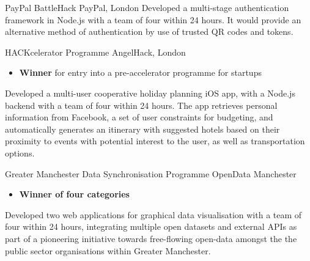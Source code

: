 \documentclass[12pt,a4paper]{article}
\begin{document}
       {PayPal BattleHack}
       {PayPal, London}
{%
  Developed a multi-stage authentication framework in Node.js with a team of
  four within 24 hours. It would provide an alternative method of authentication
  by use of trusted QR codes and tokens.
}

       {HACKcelerator Programme}
       {AngelHack, London}
{%
  \begin{itemize}
    \item{\bfseries Winner} for entry into a pre-accelerator
      programme for startups
  \end{itemize}

  Developed a multi-user cooperative holiday planning iOS app, with a Node.js
  backend with a team of four within 24 hours. The app retrieves personal
  information from Facebook, a set of user constraints for budgeting, and
  automatically generates an itinerary with suggested hotels based on their
  proximity to events with potential interest to the user, as well as
  transportation options.
}

       {Greater Manchester Data Synchronisation Programme}
       {OpenData Manchester}
{%
  \begin{itemize}
    \item {\bfseries Winner of four categories}
  \end{itemize}

  Developed two web applications for graphical data visualisation with a team of
  four within 24 hours, integrating multiple open datasets and external APIs as
  part of a pioneering initiative towards free-flowing open-data amongst the
  the public sector organisations within Greater Manchester.
}
\end{document}
